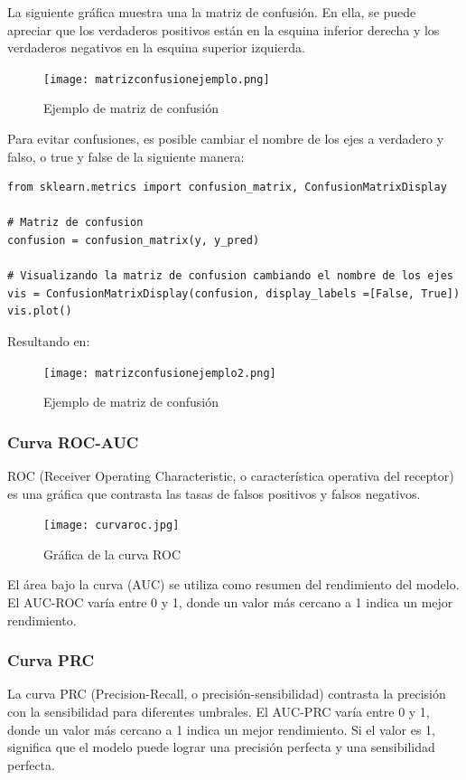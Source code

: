 \documentclass[a4paper, 12pt]{book}
\begin{document}
La siguiente gráfica muestra una la matriz de confusión. En ella, se puede apreciar que los verdaderos positivos están en la esquina inferior derecha y los verdaderos negativos en la esquina superior izquierda.
\begin{figure}[H] 
	\centering 
	\texttt{[image: matrizconfusionejemplo.png]}
	\caption{Ejemplo de matriz de confusión}
\end{figure}
Para evitar confusiones, es posible cambiar el nombre de los ejes a verdadero y falso, o true y false de la siguiente manera:
\begin{verbatim}
from sklearn.metrics import confusion_matrix, ConfusionMatrixDisplay
	
# Matriz de confusion
confusion = confusion_matrix(y, y_pred)
	
# Visualizando la matriz de confusion cambiando el nombre de los ejes
vis = ConfusionMatrixDisplay(confusion, display_labels =[False, True])
vis.plot()
\end{verbatim}
Resultando en:
\begin{figure}[H] 
	\centering 
	\texttt{[image: matrizconfusionejemplo2.png]}
	\caption{Ejemplo de matriz de confusión}
\end{figure}

\subsubsection{Curva ROC-AUC}
ROC (Receiver Operating Characteristic, o característica operativa del receptor) es una gráfica que contrasta las tasas de falsos positivos y falsos negativos.  
\begin{figure}[H] 
	\centering 
	\texttt{[image: curvaroc.jpg]}
	\caption{Gráfica de la curva ROC}
\end{figure}

El área bajo la curva (AUC) se utiliza como resumen del rendimiento del modelo. El AUC-ROC varía entre 0 y 1, donde un valor más cercano a 1 indica un mejor rendimiento.

\subsubsection{Curva PRC}
La curva PRC (Precision-Recall, o precisión-sensibilidad) contrasta la precisión con la sensibilidad para diferentes umbrales. El AUC-PRC varía entre 0 y 1, donde un valor más cercano a 1 indica un mejor rendimiento. Si el valor es 1, significa que el modelo puede lograr una precisión perfecta y una sensibilidad perfecta.
\end{document}
